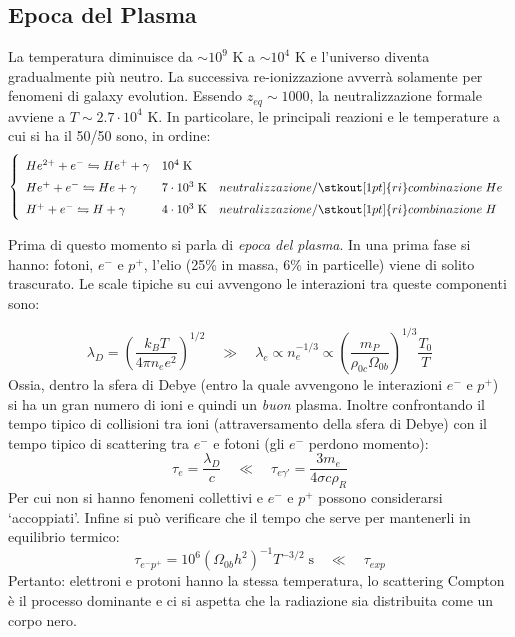 {\subsection{Epoca del Plasma}
La temperatura diminuisce da $\sim 10^9$ K a $\sim 10^4$ K e l'universo diventa gradualmente più neutro. La successiva re-ionizzazione avverrà solamente per fenomeni di galaxy evolution. Essendo $z_{eq}\sim 1000$, la neutralizzazione formale avviene a $T \sim 2.7\cdot 10^4 $ K.
 In particolare, le principali reazioni e le temperature a cui si ha il 50/50 sono, in ordine:
\begin{equation*}\left\{
    \def\arraystretch{1.5}
        \begin{array}{lll}
        He^{2+}+e^- \leftrightharpoons He^+ + \gamma & 10^4\; \mathrm{K} & \\
        He^+ + e^- \leftrightharpoons He + \gamma &  7\cdot 10^3\; \mathrm{K} & neutralizzazione/\stkout[1pt]{ri}combinazione\; He\\
        H^+ + e^- \leftrightharpoons H + \gamma &  4\cdot 10^3\; \mathrm{K} & neutralizzazione/\stkout[1pt]{ri}combinazione\; H
    \end{array}\right.
\end{equation*}

Prima di questo momento si parla di \textit{epoca del plasma}. 
In una prima fase si hanno: fotoni, $e^-$ e $ p^+$, l'elio (25\% in massa, 6\% in particelle) viene di solito trascurato. Le scale tipiche su cui avvengono le interazioni tra queste componenti sono:

$$ \lambda_D =  \left( \frac{k_BT}{4\pi n_e e^2}\right)^{1/2} \quad \gg \quad \lambda_e \propto n_e^{-1/3} \propto \left ( \frac{m_P}{\rho_{0c}\Omega_{0b}}\right)^{1/3} \frac{T_0}{T}$$
Ossia, dentro la sfera di Debye (entro la quale avvengono le interazioni $e^-$ e $p^+$) si ha un gran numero di ioni e quindi un \textit{buon} plasma. Inoltre confrontando il tempo tipico di collisioni tra ioni (attraversamento della sfera di Debye) con il tempo tipico di scattering tra $e^-$ e fotoni (gli $e^-$ perdono momento):
$$ \tau_e = \frac{\lambda_D}{c} \quad \ll \quad \tau_{e\gamma '}=\frac{3m_e}{4\sigma c \rho_R} $$
Per cui non si hanno fenomeni collettivi e $e^-$ e $p^+$ possono considerarsi `accoppiati'. Infine si può verificare che il tempo che serve per mantenerli in equilibrio termico:
$$ \tau_{e^- p^+} = 10^6 (\Omega_{0b}h^2)^{-1} T^{-3/2}\; \textrm{s}  \quad \ll \quad \tau_{exp}$$
Pertanto: elettroni e protoni hanno la stessa temperatura, lo scattering Compton è il processo dominante e ci si aspetta che la radiazione sia distribuita come un corpo nero.

}
